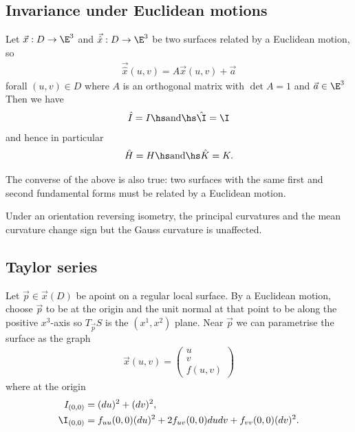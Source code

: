 \documentclass{article}
\begin{document}
\subsection{Invariance under Euclidean motions}

\begin{theorem}[Notes 9.7]
    Let $\vec x: D\to\E^3$ and $\vec{\hat x}:D\to\E^3$ be two surfaces related by a
    Euclidean motion, so
    \begin{align*}
        \vec{\hat x} (u,v) = A\vec x(u,v)+\vec a
    \end{align*}
    forall $(u,v)\in D$ where $A$ is an orthogonal matrix with $\det A=1$ and $\vec a\in\E^3$
    Then we have
    \begin{align*}
        \hat I = I \hs \text{and} \hs \hat\I = \I
    \end{align*}
    and hence in particular
    \begin{align*}
        \hat H = H \hs \text{and} \hs \hat K = K.
    \end{align*}
\end{theorem}

\begin{theorem}
    The converse of the above is also true: two surfaces with the same first and second
    fundamental forms must be related by a Euclidean motion.
\end{theorem}

\begin{proposition}[Notes 9.9]
    Under an orientation reversing isometry, the principal curvatures and the mean curvature
    change sign but the Gauss curvature is unaffected.
\end{proposition}

\subsection{Taylor series}

\begin{proposition}[Notes 9.10]
    Let $\vec p \in \vec x(D)$ be apoint on a regular local surface. By a Euclidean motion,
    choose $\vec p$ to be at the origin and the unit normal at that point to be along the positive
    $x^3$-axis so $T_{\vec p}S$ is the $(x^1,x^2)$ plane. Near $\vec p$ we can parametrise
    the surface as the graph
    \begin{align*}
        \vec x(u,v)=\begin{pmatrix}
            u \\ v \\ f(u,v)
        \end{pmatrix}
    \end{align*}
    where at the origin
    \begin{align*}
        I_{(0,0)}  & =(du)^2+(dv)^2,                                        \\
        \I_{(0,0)} & =f_{uu}(0,0)(du)^2+2f_{uv}(0,0)dudv+f_{vv}(0,0)(dv)^2.
    \end{align*}
\end{proposition}
\end{document}
